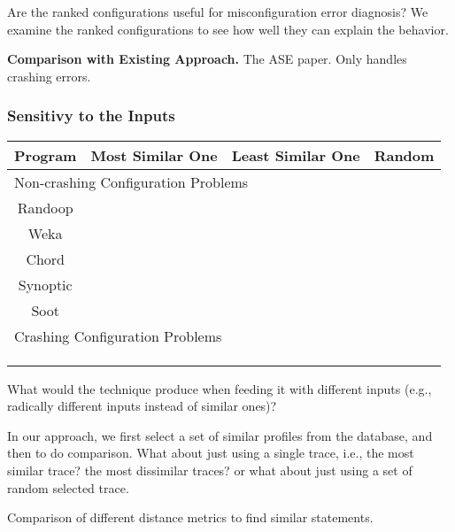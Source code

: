 Are the ranked configurations useful for misconfiguration error diagnosis?
We examine the ranked configurations to see how well they can explain the behavior.

\noindent \textbf{Comparison with Existing Approach.}
The ASE paper. Only handles crashing errors.

\subsubsection{Sensitivy to the Inputs}

\begin{table}[t]
\setlength{\tabcolsep}{.84\tabcolsep}
\begin{tabular}{|c|c|c|c|}
\hline
 Program & Most Similar One& Least Similar One& Random \\
 \hline
\hline
\multicolumn{4}{|l|}{Non-crashing Configuration Problems}   \\
 \hline
 Randoop & & &   \\
\hline
 Weka &  & & \\
\hline
 Chord & & & \\
\hline
 Synoptic & & &  \\
\hline
 Soot &  &  &  \\
\hline
\hline
\multicolumn{4}{|l|}{Crashing Configuration Problems}   \\
\hline
& & & \\
\hline
& & & \\
\hline
& & & \\
\hline
\end{tabular}

\end{table}

What would the technique produce when feeding it with different inputs (e.g.,
radically different inputs instead of similar ones)?

In our approach, we first select a set of similar profiles from the  database,
and then to do comparison. What about just using a single trace, i.e., the
most similar trace? the most dissimilar traces? or what about just using a set
of random selected trace.

Comparison of different distance metrics to find similar statements.

